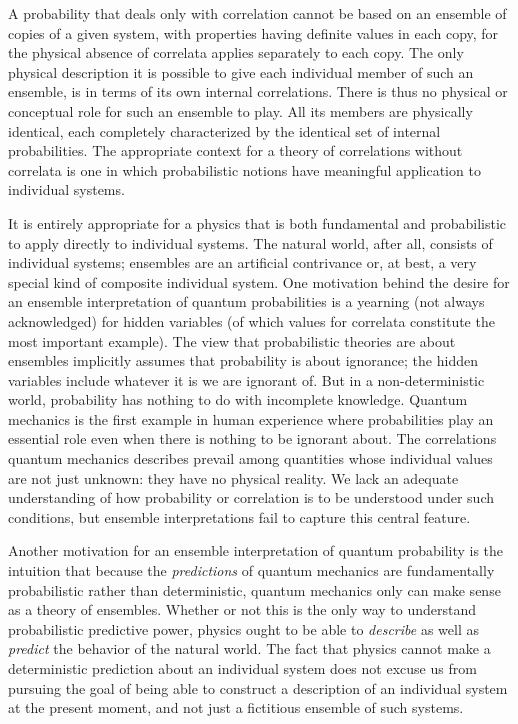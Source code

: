 A probability that deals only with correlation cannot be based on an
ensemble of copies of a given system, with properties having definite
values in each copy, for the physical absence of correlata applies
separately to each copy.  The only physical description it is possible
to give each individual member of such an ensemble, is in terms of its
own internal correlations.  There is thus no physical or
conceptual role for such an ensemble to play.  All its members are
physically identical, each completely characterized by the identical
set of internal probabilities.  The appropriate context for a theory
of correlations without correlata is one in which probabilistic
notions have meaningful application to individual systems.

It is entirely appropriate for a physics that is both fundamental and
probabilistic to apply directly to individual systems.  The natural
world, after all, consists of individual systems; ensembles are an
artificial contrivance or, at best, a very special kind of composite
individual system.  One motivation behind the desire for an ensemble
interpretation of quantum probabilities is a yearning (not always
acknowledged) for hidden variables (of which values for correlata
constitute the most important example).  The view that probabilistic
theories are about ensembles implicitly assumes that probability is
about ignorance; the hidden variables include whatever it is we are
ignorant of.  But in a non-deterministic world, probability has
nothing to do with incomplete knowledge.  Quantum mechanics is the
first example in human experience where probabilities play an
essential role even when there is nothing to be ignorant
about.  The correlations quantum mechanics describes prevail among
quantities whose individual values are not just unknown: they have no
physical reality.  We lack an adequate understanding of how
probability or correlation is to be understood under such conditions,
but ensemble interpretations fail to capture this central
feature.

Another motivation for an ensemble interpretation of quantum
probability is the intuition that because the {\it predictions\/} of
quantum mechanics are fundamentally probabilistic rather than
deterministic, quantum mechanics only can make sense as a theory of
ensembles.  Whether or not this is the only way to understand
probabilistic predictive power, physics ought to be able to {\it
describe\/} as well as {\it predict\/} the behavior of the natural
world.  The fact that physics cannot make a deterministic prediction
about an individual system does not excuse us from pursuing the goal
of being able to construct a description of an individual system at
the present moment, and not just a fictitious ensemble of such systems.

